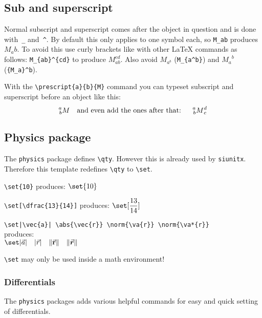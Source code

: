 \subsection{Sub and superscript}
    Normal subscript and superscript comes after the object in question and is done with~\texttt{\_} and~\texttt{\^}. By default this only applies to one symbol each, so \verb|M_ab| produces $M_ab$. To avoid this use curly brackets like with other \LaTeX{} commands as follows: \verb|M_{ab}^{cd}| to produce $M_{ab}^{cd}$. Also avoid $M_{a^b}$ (\verb*|M_{a^b}|) and ${M_a}^b$ (\verb*|{M_a}^b|).

    With the \verb|\prescript{a}{b}{M}| command you can typeset subscript and superscript before an object like this:
    \[
        \prescript{a}{b}{M}
        \text{\quad and even add the ones after that: \quad}
        \prescript{a}{b}{M}_c^d
    \]



\subsection{Physics package}

    The \verb|physics| package defines \verb|\qty|. However this is already used by \texttt{siunitx}. Therefore this template redefines \verb|\qty| to \verb|\set|.

    \begin{center}
        \verb|\set{10}|             produces: $\set{10}$

        \verb|\set[\dfrac{13}{14}]| produces: $\set[\dfrac{13}{14}]$

        \verb/\set|\vec{a}| \abs{\vec{r}} \norm{\va{r}} \norm{\va*{r}}/ \\
            produces: \\
            $\set|\vec{a}| \quad  \abs{\vec{r}} \quad \norm{\va{r}} \quad \norm{\va*{r}} $
    \end{center}


    \begin{warningbox}
        \verb*|\set| may only be used inside a math environment!
    \end{warningbox}

    \subsubsection{Differentials}

        The \texttt{physics} packages adds various helpful commands for easy and quick setting of differentials.

